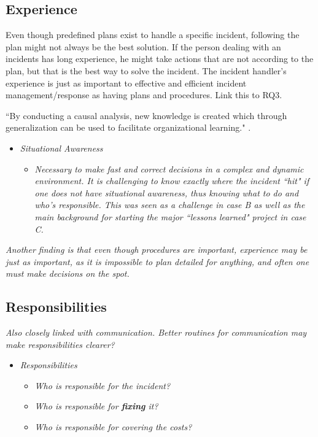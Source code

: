 \subsection{Experience}

Even though predefined plans exist to handle a specific incident, following the plan might not always be the best solution. If the person dealing with an incidents has long experience, he might take actions that are not according to the plan, but that is the best way to solve the incident. The incident handler's experience is just as important to effective and efficient incident management/response as having plans and procedures. Link this to RQ3.

``By conducting a causal analysis, new knowledge is created which through generalization can be used to facilitate organizational learning."\cite{werlinger2010preparation}
.

\begin{itemize}
\item \textit{Situational Awareness}
\begin{itemize}
\item\textit{ Necessary to make fast and correct decisions in a complex and dynamic environment. It is challenging to know exactly where the incident ``hit" if one does not have situational awareness, thus knowing what to do and who's responsible. This was  seen as a challenge in case B as well as the main background for starting the major ``lessons learned" project in case C.}
\end{itemize}
\end{itemize}

\textit{Another finding is that even though procedures are important, experience may be just as important, as it is impossible to plan detailed for anything, and often one must make decisions on the spot.}

\subsection{Responsibilities}
\textit{Also closely linked with communication. Better routines for communication may make responsibilities clearer?}

\begin{itemize}
\item \textit{Responsibilities}
\begin{itemize}
\item \textit{Who is responsible for the incident?}
\item \textit{Who is responsible for \textbf{fixing} it?}
\item \textit{Who is responsible for covering the costs?}
\end{itemize}
\end{itemize}

